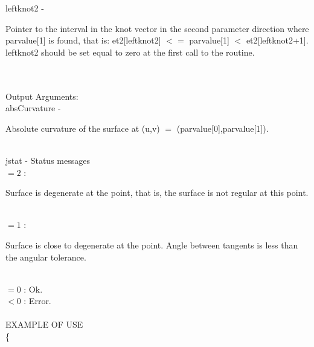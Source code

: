         \>\>    {\fov leftknot2}\> - \>  \begin{minipg2}
                     Pointer to the interval in the knot vector in the
                     second parameter direction where parvalue[1] is found,
                     that is:
                          et2[leftknot2] $<=$ parvalue[1] $<$ et2[leftknot2+1].
                     leftknot2 should be set equal to zero at the first call
                     to the routine.
                               \end{minipg2}\\[0.8ex]
\\
	\>Output Arguments:\\
        \>\>    {\fov absCurvature}\> - \>  \begin{minipg2}
                     Absolute curvature of the surface at (u,v) $=$
                     (parvalue[0],parvalue[1]).
                               \end{minipg2}\\
        \>\>    {\fov jstat}     \> - \> Status messages\\
                \>\>\>\> $= 2$ : 
                       \> \begin{minipg5}  
                               Surface is degenerate at the point, that is,
                               the surface is not regular at this point.
                               \end{minipg5}\\[0.8ex]
                \>\>\>\>  $= 1$ :
                       \> \begin{minipg5}  
                               Surface is close to degenerate at the point.
                               Angle between tangents is less than the angular
                               tolerance.
                               \end{minipg5}\\[0.8ex]
                \>\>\>\> $= 0$ : \> Ok.\\
                \>\>\>\> $< 0$ : \> Error.\\
\\
EXAMPLE OF USE\\
		\>      \{ \\


